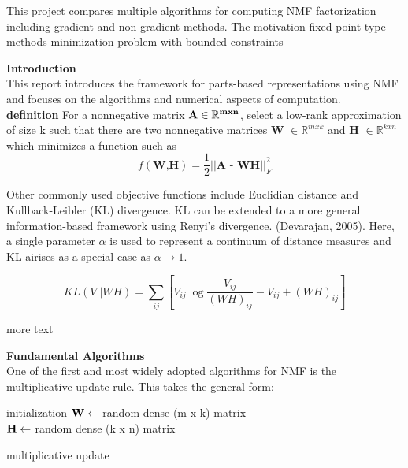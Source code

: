 \documentclass[12pt]{article}
\begin{document}
This project compares multiple algorithms for computing NMF factorization including gradient and non gradient methods. The motivation 
fixed-point type methods 
minimization problem with bounded constraints 

\textbf{Introduction} \\
This report introduces the framework for parts-based representations using NMF and focuses on the algorithms and numerical aspects of computation. \\

\textbf{definition} For a nonnegative matrix $\bf{A} \in \mathbb{R}^{m x n}$, select a low-rank approximation of size k such that there are two nonnegative matrices \textbf{W} $ \in \mathbb{R}^{m x k}$ and \textbf{H} $ \in \mathbb{R}^{k x n}$ which minimizes a function such as 
$$ f( \textbf{W,H}) = \frac{1}{2} || \textbf{A - WH} || ^{2}_{F}$$


Other commonly used objective functions include Euclidian distance and Kullback-Leibler (KL) divergence. KL can be extended to a more general information-based framework using Renyi's divergence. (Devarajan, 2005). Here, a single parameter $\alpha$ is used to represent a continuum of distance measures and KL airises as a special case as $\alpha \to 1$. 

$$ KL(V || WH) = \sum_{ij}{[V_{ij} \log{ \frac{V_{ij}}{(WH)_{ij}} - V_{ij} + (WH)_{ij}} ]} $$

more text

\pagebreak 

\textbf{Fundamental Algorithms} \\

One of the first and most widely adopted algorithms for NMF is the multiplicative update rule. This takes the general form: \\


\begin{algorithm}[H]

 initialization\;
$\bf{W} \gets $ random dense (m x k) matrix\\
$\bf{H} \gets $ random dense (k x n) matrix\\
 \caption{multiplicative update}
\end{algorithm} 
\end{document}
